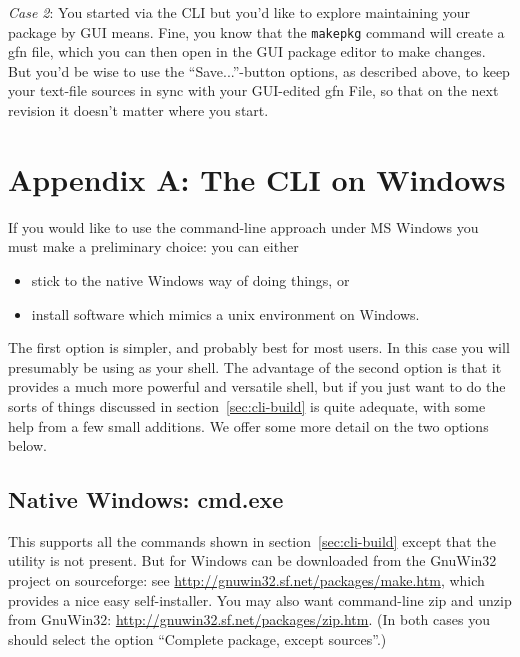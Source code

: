 \documentclass[oneside]{book}
\begin{document}
\textit{Case 2}: You started via the CLI but you'd like to explore
maintaining your package by GUI means. Fine, you know that the
\texttt{makepkg} command will create a \textsf{gfn} file, which you can
then open in the GUI package editor to make changes. But you'd be wise
to use the ``\textsf{Save...}''-button options, as described above, to
keep your text-file sources in sync with your GUI-edited \textsf{gfn}
File, so that on the next revision it doesn't matter where you start.

\clearpage

\section*{Appendix A: The CLI on Windows}

If you would like to use the command-line approach under MS Windows
you must make a preliminary choice: you can either
\begin{itemize}
\item stick to the native Windows way of doing things, or
\item install software which mimics a unix environment on Windows.
\end{itemize}

The first option is simpler, and probably best for most users. In this
case you will presumably be using  as your shell. The
advantage of the second option is that it provides a much more
powerful and versatile shell, but if you just want to do the sorts of
things discussed in section~\ref{sec:cli-build}  is quite
adequate, with some help from a few small additions.  We offer some
more detail on the two options below.

\subsection*{Native Windows: cmd.exe}
\label{sec:cmd.exe}

This supports all the commands shown in section~\ref{sec:cli-build}
except that the  utility is not present. But  for
Windows can be downloaded from the \textsf{GnuWin32} project on
sourceforge: see \url{http://gnuwin32.sf.net/packages/make.htm},
which provides a nice easy self-installer. You may also want
command-line \textsf{zip} and \textsf{unzip} from \textsf{GnuWin32}:
\url{http://gnuwin32.sf.net/packages/zip.htm}. (In both cases you
should select the option ``Complete package, except sources''.)
\end{document}
